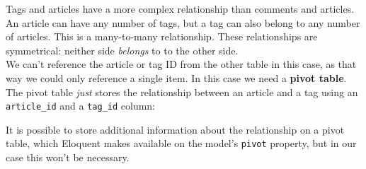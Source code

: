 Tags and articles have a more complex relationship than comments and articles. An article can have any number of tags, but a tag can also belong to any number of articles. This is a many-to-many relationship. These relationships are symmetrical: neither side \textit{belongs} to to the other side.
\\

We can't reference the article or tag ID from the other table in this case, as that way we could only reference a single item. In this case we need a \textbf{pivot table}. The pivot table \textit{just} stores the relationship between an article and a tag using an \texttt{article\_id} and a \texttt{tag\_id} column:


It is possible to store additional information about the relationship on a pivot table, which Eloquent makes available on the model's \texttt{pivot} property, but in our case this won't be necessary.

\pagebreak


